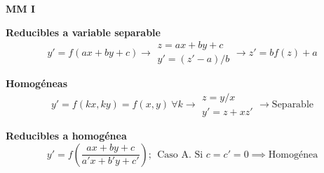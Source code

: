 \documentclass[10pt,landscape,letterpaper]{article}
\begin{document}
\footnotesize

\begin{center}
  {\huge\sffamily\bfseries MM I}\\
\end{center}
\setlength{\premulticols}{0pt}
\setlength{\postmulticols}{0pt}
\setlength{\multicolsep}{1pt}
\setlength{\columnsep}{1.8em}
\begin{multicols}{3}
\textbf{Reducibles a variable separable}
\vspace{-5pt}
\[y'=f(ax+by+c) \rightarrow \begin{matrix}
  z=ax+by+c \\
  y' = {(z'-a)}/{b}
\end{matrix} \rightarrow z' = bf(z)+a\]

\vspace{-7pt}
\textbf{Homogéneas}
\vspace{-8pt}
\[y'=f(kx,ky)=f(x,y) \ \forall k \rightarrow \begin{matrix}
  z=y/x \\
  y' = z+xz' \end{matrix}  \rightarrow \mbox{Separable}\]

\vspace{-8pt}
\textbf{Reducibles a homogénea}
\vspace{-3pt}
\[y'=f\left(\frac{ax+by+c}{a'x+b'y+c'}\right); \ \ \boxed{\mbox{Caso A. Si } c=c'=0 \implies \mbox{Homogénea}}\]

\fbox{\begin{minipage}{29em}
\vspace{-5pt}
\[\mbox{B. Si } \left|\begin{matrix}
  a & b \\ a' & b'
\end{matrix}\right| \neq 0; \  \left\{\begin{matrix}
  x=\alpha + h \\ y= \beta +k
\end{matrix}\right. \mbox{ : } \frac{ax+by+c}{a'x+b'y+c'} = \frac{a\alpha+b\beta}{a'\alpha+b'\beta} \]\end{minipage}}

\fbox{\begin{minipage}{29em}
\vspace{-5pt}
\[\mbox{C. Si } \left|\begin{matrix}
  a & b \\ a' & b'
\end{matrix}\right| = 0; y'=f\left(\frac{ax+by+c}{d(ax+by)+c'}\right); \begin{matrix}
  z=ax+by \\ \mbox{Sep.}
\end{matrix}\]
\end{minipage}}


\end{multicols}
\end{document}
